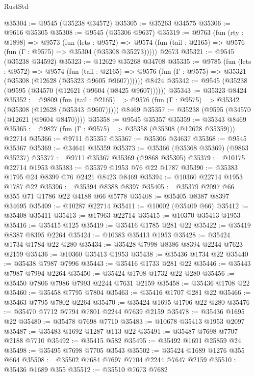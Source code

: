 \begin{lexlean}{RustStd}
\begin{coremodule}
@35304 := @9545 (@35238 @34572)
@35305 := @35263 @34575
@35306 := @9616 @35305
@35308 := @9545 (@35306 @9637)
@35319 := @9763
    (fun (rty : @1898) =>
    @9573
      (fun (lets : @9572) =>
      @9574 (fun (tail : @2165) => @9576 (fun (Γ : @9575) => @35304 (@35308 @35273)))))
    @2673
@35321 := @9545 (@35238 @34592)
@35323 := @12629 @35268 @34708
@35335 := @9785
    (fun (lets : @9572) =>
    @9574
      (fun (tail : @2165) =>
      @9576 (fun (Γ : @9575) => @35321 (@35308 (@12628 (@35323 @9605 @9607))))))
    @8424
@35342 := @9545 (@35238 (@9595 (@34570 (@12621 (@9604 (@8425 @9607))))))
@35343 := @35323 @8424
@35352 := @9809
    (fun (tail : @2165) => @9576 (fun (Γ : @9575) => @35342 (@35308 (@12628 (@35343 @9607)))))
    @8469
@35357 := @35238 (@9595 (@34570 (@12621 (@9604 @8470))))
@35358 := @9545 @35357
@35359 := @35343 @8469
@35365 := @9827 (fun (Γ : @9575) => @35358 (@35308 (@12628 @35359))) @22714
@35366 := @9711 @35357
@35367 := @35306 @34637
@35368 := @9545 @35367
@35369 := @34641 @35359
@35373 := @35366 (@35368 @35369) (@9863 @35237)
@35377 := @9711 @35367 @35369 (@9868 @35305)
@35379 := @10175 @22714 @1953
@35383 := @35379 @1953 @76 @22 @1787
@35390 := @35383 @1795 @24 @8399 @76 @2421 @8423 @8469
@35394 := @10360 @22714 @1953 @1787 @22
@35396 := @35394 @8388 @8397
@35405 := @35379 @2097 @66 @355 @71 @1786 @22 @4188 @66 @5778
@35408 := @35405 @8387 @8397 @34695
@35409 := @10287 @22714
@35411 := @10002 (@35409 @66)
@35412 := @35408 @35411
@35413 := @17963 @22714
@35415 := @10370 @35413 @1953
@35416 := @35415 @125
@35419 := @35416 @1785 @281 @22
@35422 := @35419 @8387 @8395 @2264
@35424 := @10383 @35413 @1953
@35428 := @35424 @1734 @1784 @22 @280
@35434 := @35428 @7998 @8386 @8394 @2244 @7623 @2159
@35436 := @10360 @35413 @1953
@35438 := @35436 @1734 @22
@35440 := @35438 @7987 @7996
@35443 := @35416 @1733 @281 @22
@35446 := @35443 @7987 @7994 @2264
@35450 := @35424 @1708 @1732 @22 @280
@35456 := @35450 @7806 @7986 @7993 @2244 @7631 @2159
@35458 := @35436 @1708 @22
@35460 := @35458 @7795 @7804
@35463 := @35416 @1707 @281 @22
@35466 := @35463 @7795 @7802 @2264
@35470 := @35424 @1695 @1706 @22 @280
@35476 := @35470 @7712 @7794 @7801 @2244 @7639 @2159
@35478 := @35436 @1695 @22
@35480 := @35478 @7698 @7710
@35483 := @10678 @35413 @1953 @2097
@35487 := @35483 @1692 @1287 @113 @22
@35491 := @35487 @7698 @7707 @2188 @7710
@35492 := @35415 @582
@35495 := @35492 @1691 @25859 @24
@35498 := @35495 @7698 @7705 @3543
@35502 := @35424 @1689 @1276 @355 @664
@35508 := @35502 @7684 @7697 @7704 @2244 @7647 @2159
@35510 := @35436 @1689 @355
@35512 := @35510 @7673 @7682

\end{coremodule}
\end{lexlean}
